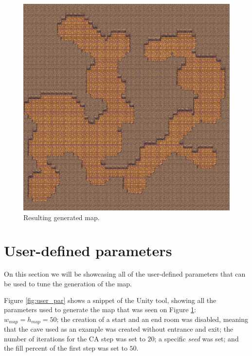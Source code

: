 \begin{figure}[h]
    \caption{Resulting generated map.}
    \centerline{\includegraphics{images/development/final_result.png}}
    \label{fig:map_result}
\end{figure}

\section{User-defined parameters}

On this section we will be showcasing all of the user-defined parameters that can be used to tune the generation of the map.

Figure \ref{fig:user_par} shows a snippet of the Unity tool, showing all the parameters used to generate the map that was seen on Figure \ref{fig:map_result}: \(w_{map} = h_{map} = 50\); the creation of a start and an end room was disabled, meaning that the cave used as an example was created without entrance and exit; the number of iterations for the CA step was set to \(20\); a specific \emph{seed} was set; and the fill percent of the first step was set to \(50\).

